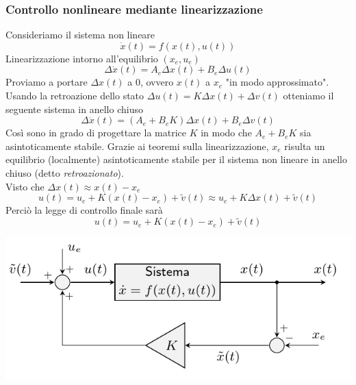 \documentclass{article}
\numberwithin{equation}{subsection}
\begin{document}
\subsubsection{Controllo nonlineare mediante linearizzazione}
Consideriamo il sistema non lineare
\begin{equation}
    \dot x(t) = f(x(t),u(t))
\end{equation}
Linearizzazione intorno all'equilibrio $(x_e,u_e)$
\begin{equation}
    \Delta \dot x(t) = A_e \Delta x(t) + B_e \Delta u(t)
\end{equation}
Proviamo a portare $\Delta x(t)$ a 0, ovvero $x(t)$ a $x_e$ "in modo approssimato". Usando la retroazione dello stato $\Delta u(t) = K \Delta x(t) + \Delta v(t)$ otteniamo il seguente sistema in anello chiuso
\begin{equation}
    \Delta \dot x(t) = (A_e + B_e K)\Delta x(t) + B_e \Delta v(t)
\end{equation}
Così sono in grado di progettare la matrice $K$ in modo che $A_e + B_e K$ sia asintoticamente stabile. Grazie ai teoremi sulla linearizzazione, $x_e$ risulta un equilibrio (localmente) asintoticamente stabile per il sistema non lineare in anello chiuso (detto \textit{retroazionato}).
\vspace*{0.1cm}\\
Visto che $\Delta x(t) \approx x(t) - x_e$
\begin{equation}
    u(t) = u_e + K(x(t) - x_e) + \tilde{v}(t) \approx u_e + K \Delta x(t) + \tilde{v}(t)
\end{equation}
Perciò la legge di controllo finale sarà
\begin{equation}
    u(t) = u_e + K(x(t)-x_e) + \tilde{v}(t)
\end{equation}
\begin{center}
    \includegraphics[scale=0.4]{Images/Controllo_retroazionato.png}
\end{center}
 
\end{document}
